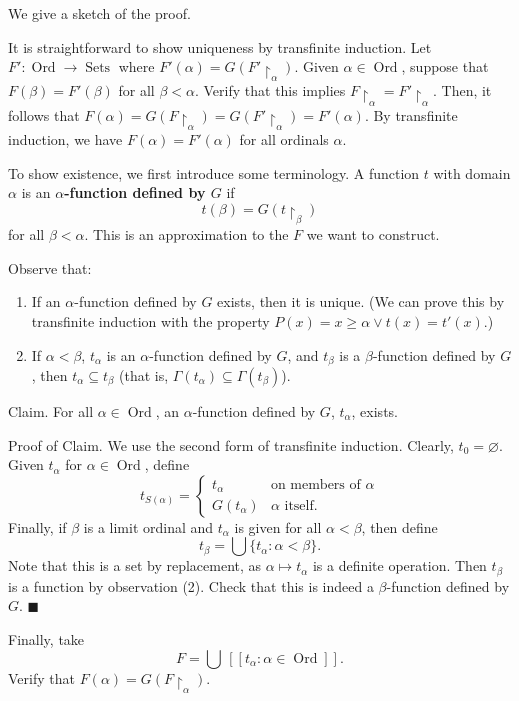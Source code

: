 \documentclass[10pt]{article}
\makeatletter
\DeclareMathOperator{\Sets}{Sets}
\DeclareMathOperator{\Ord}{Ord}
\theoremstyle{newstyle}
\newenvironment{pf}[1][\proofname]{\par
  \pushQED{\qed}%
  \normalfont \topsep0\p@\relax
  \trivlist
  \item[\hskip\labelsep\scshape
  #1\@addpunct{.}]\ignorespaces
}{%
  \popQED\endtrivlist\@endpefalse
}
\makeatother
\begin{document}
\begin{pf}
We give a sketch of the proof. 

It is straightforward to show uniqueness by transfinite induction. Let $F' : \Ord \to \Sets$ 
where $F'(\alpha) = G(F' \upharpoonright_\alpha)$. Given $\alpha \in \Ord$, suppose that 
$F(\beta) = F'(\beta)$ for all $\beta < \alpha$. Verify that this implies $F \upharpoonright_\alpha 
= F' \upharpoonright_\alpha$. Then, it follows that $F(\alpha) = G(F \upharpoonright_\alpha) 
= G(F' \upharpoonright_\alpha) = F'(\alpha)$. By transfinite induction, we have $F(\alpha) = 
F'(\alpha)$ for all ordinals $\alpha$.

To show existence, we first introduce some terminology. A function $t$ with domain $\alpha$ is 
an {\bf $\alpha$-function defined by $G$} if 
\[ t(\beta) = G(t \upharpoonright_\beta) \] 
for all $\beta < \alpha$. This is an approximation to the $F$ we want to construct. 

Observe that: 
\begin{enumerate}[(1)]
    \item If an $\alpha$-function defined by $G$ exists, then it is unique. (We can prove this by transfinite induction with the property $P(x) = x \geq \alpha \vee t(x) = t'(x)$.) 
    \item If $\alpha < \beta$, $t_\alpha$ is an $\alpha$-function defined by $G$, and 
    $t_\beta$ is a $\beta$-function defined by $G$, then $t_\alpha \subseteq t_\beta$
    (that is, $\Gamma(t_\alpha) \subseteq \Gamma(t_\beta)$).
\end{enumerate} 
{\sc Claim.} For all $\alpha \in \Ord$, an $\alpha$-function defined by $G$, $t_\alpha$, exists. 

{\sc Proof of Claim.} We use the second form of transfinite induction. Clearly, $t_0 = \varnothing$. 
Given $t_\alpha$ for $\alpha \in \Ord$, define 
\[ t_{S(\alpha)} = \begin{cases} t_\alpha & \text{on members of $\alpha$} \\ 
G(t_\alpha) & \text{$\alpha$ itself}. \end{cases} \]
Finally, if $\beta$ is a limit ordinal and $t_\alpha$ is given for all $\alpha < \beta$, then 
define 
\[ t_\beta = \textstyle\bigcup \{t_\alpha : \alpha < \beta\}. \] 
Note that this is a set by replacement, as $\alpha \mapsto t_\alpha$ is a definite operation. 
Then $t_\beta$ is a function by observation (2). Check that this is indeed a $\beta$-function 
defined by $G$. \hfill $\blacksquare$

Finally, take 
\[ F = \bigcup \,[[t_\alpha : \alpha \in \Ord]]. \]
Verify that $F(\alpha) = G(F \upharpoonright_\alpha)$. 
\end{pf}
\end{document}
